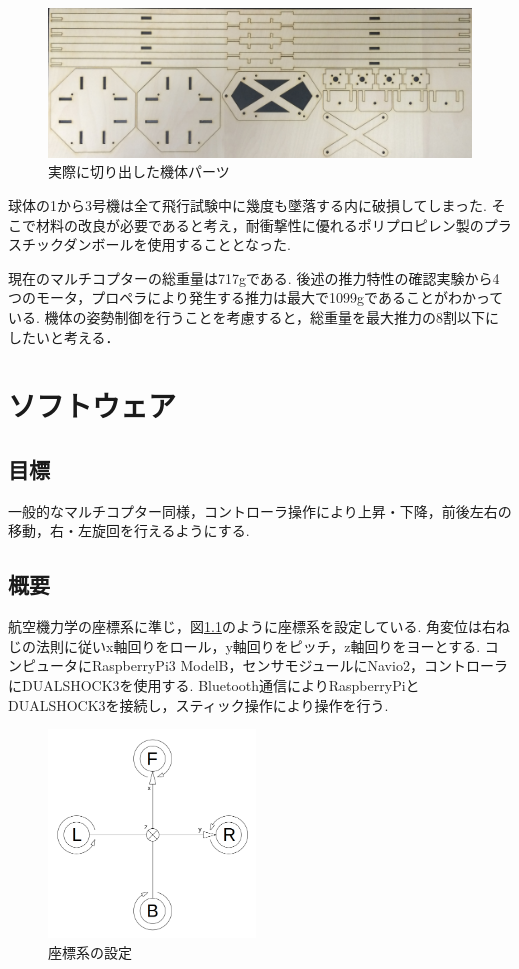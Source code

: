 \documentclass[12pt,oneside]{sotsuken_paper}
\begin{document}
\begin{figure}[htbp]
	\begin{center}
		\includegraphics[width=120mm]{image/drone/cut.jpg}
		\caption{実際に切り出した機体パーツ}
		\label{fig:cut}
	\end{center}
\end{figure}

球体の1から3号機は全て飛行試験中に幾度も墜落する内に破損してしまった.
そこで材料の改良が必要であると考え，耐衝撃性に優れるポリプロピレン製のプラスチックダンボールを使用することとなった.

現在のマルチコプターの総重量は717gである.
後述の推力特性の確認実験から4つのモータ，プロペラにより発生する推力は最大で1099gであることがわかっている.
機体の姿勢制御を行うことを考慮すると，総重量を最大推力の8割以下にしたいと考える．%


\chapter{ソフトウェア}

\section{目標}
一般的なマルチコプター同様，コントローラ操作により上昇・下降，前後左右の移動，右・左旋回を行えるようにする.

\section{概要}
航空機力学の座標系\cite{config}に準じ，図\ref{fig:config}のように座標系を設定している.
角変位は右ねじの法則に従いx軸回りをロール，y軸回りをピッチ，z軸回りをヨーとする.
コンピュータにRaspberryPi3 ModelB，センサモジュールにNavio2，コントローラにDUALSHOCK3を使用する.
Bluetooth通信によりRaspberryPiとDUALSHOCK3を接続し，スティック操作により操作を行う.

\begin{figure}[htbp]
	\begin{center}
		\includegraphics[width=55mm]{image/config.png}
		\caption{座標系の設定}
		\label{fig:config}
	\end{center}
\end{figure}
\end{document}
